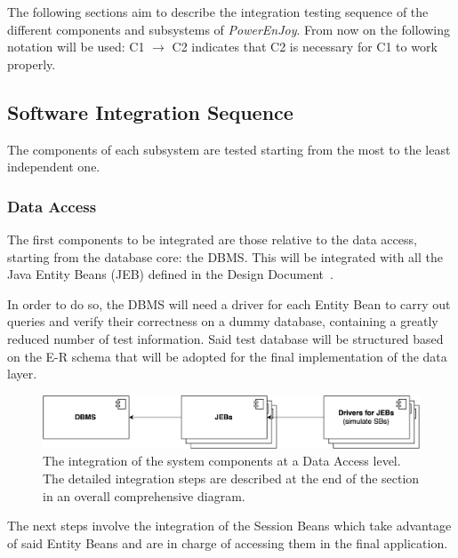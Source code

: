 The following sections aim to describe the integration testing sequence of the different components and subsystems of \emph{PowerEnJoy}. From now on the following notation will be used: C1 $\rightarrow$ C2 indicates that C2 is necessary for C1 to work properly.

\subsection{Software Integration Sequence}
The components of each subsystem are tested starting from the most to the least independent one.

\subsubsection{Data Access}
The first components to be integrated are those relative to the data access, starting from the database core: the DBMS. This will be integrated with all the Java Entity Beans (JEB) defined in the Design Document~\cite{dd}. 

In order to do so, the DBMS will need a driver for each Entity Bean to carry out queries and verify their correctness on a dummy database, containing a greatly reduced number of test information. Said test database will be structured based on the E-R schema that will be adopted for the final implementation of the data layer.

\begin{figure}[H]
\begin{center}
		\includegraphics[width=\textwidth]{./integration_strategy/diagrams/data_access.png}
		\caption{The integration of the system components at a Data Access level. The detailed integration steps are described at the end of the section in an overall comprehensive diagram.}
\end{center}
\end{figure}

\noindent
The next steps involve the integration of the Session Beans which take advantage of said Entity Beans and are in charge of accessing them in the final application.

